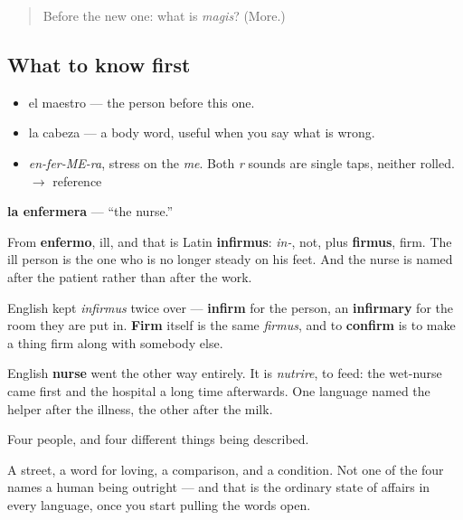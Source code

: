 \label{lesson:ES-C285-enfermera}



\begin{quote}
Before the new one: what is \emph{magis}? (More.)
\end{quote}

\subsection*{What to know first}
\begin{itemize}
\raggedright
  \item el maestro — the person before this one.
  \item la cabeza — a body word, useful when you say what is wrong.
\end{itemize}

\begin{sounds}
\begin{itemize}
\raggedright
  \item \emph{en-fer-ME-ra}, stress on the \emph{me}. Both \emph{r} sounds are single taps, neither rolled. $\to$ reference
\end{itemize}
\end{sounds}

\begin{cousinweb}
\textbf{la enfermera} — \textquotedblleft{}the nurse.\textquotedblright{}

From \textbf{enfermo}, ill, and that is Latin \textbf{infirmus}: \emph{in-}, not, plus \textbf{firmus}, firm. The ill person is the one who is no longer steady on his feet. And the nurse is named after the patient rather than after the work.

English kept \emph{infirmus} twice over — \textbf{infirm} for the person, an \textbf{infirmary} for the room they are put in. \textbf{Firm} itself is the same \emph{firmus}, and to \textbf{confirm} is to make a thing firm along with somebody else.

English \textbf{nurse} went the other way entirely. It is \emph{nutrire}, to feed: the wet-nurse came first and the hospital a long time afterwards. One language named the helper after the illness, the other after the milk.
\end{cousinweb}

\begin{grammarlens}[title={What you've built}]
Four people, and four different things being described.

A street, a word for loving, a comparison, and a condition. Not one of the four names a human being outright — and that is the ordinary state of affairs in every language, once you start pulling the words open.
\end{grammarlens}

